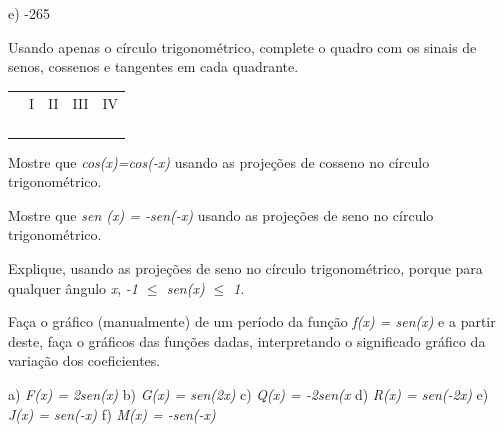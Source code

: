 \begin{exercicios}
e) -265\degree

\exitem{} Usando apenas o círculo trigonométrico, complete o quadro com os sinais de senos, cossenos e tangentes em cada quadrante.

\begin{table}[H]
             \centering
\begin{tabular}{p{0.96in}p{0.41in}p{0.39in}p{0.39in}p{0.39in}}
\hline
\multicolumn{1}{|p{0.96in}}{} &
\multicolumn{1}{|p{0.41in}}{I} &
\multicolumn{1}{|p{0.39in}}{II} &
\multicolumn{1}{|p{0.39in}}{III} &
\multicolumn{1}{|p{0.39in}|}{IV} \\
\hhline{-----}
\multicolumn{1}{|p{0.96in}}{Senos} &
\multicolumn{1}{|p{0.41in}}{} &
\multicolumn{1}{|p{0.39in}}{} &
\multicolumn{1}{|p{0.39in}}{} &
\multicolumn{1}{|p{0.39in}|}{} \\
\hhline{-----}
\multicolumn{1}{|p{0.96in}}{Cossenos} &
\multicolumn{1}{|p{0.41in}}{} &
\multicolumn{1}{|p{0.39in}}{} &
\multicolumn{1}{|p{0.39in}}{} &
\multicolumn{1}{|p{0.39in}|}{} \\
\hhline{-----}
\multicolumn{1}{|p{0.96in}}{Tangentes } &
\multicolumn{1}{|p{0.41in}}{} &
\multicolumn{1}{|p{0.39in}}{} &
\multicolumn{1}{|p{0.39in}}{} &
\multicolumn{1}{|p{0.39in}|}{} \\
\hhline{-----}

\end{tabular}
 \end{table}

\item Mostre que \textit{cos(x)=cos(-x)} usando as projeções de cosseno no círculo trigonométrico.

\item Mostre que  \textit{sen (x) = -sen(-x)} usando as projeções de seno no círculo trigonométrico.

\item Explique, usando as projeções de seno no círculo trigonométrico, porque para qualquer ângulo \textit{x}, \textit{-1 $ \leq $  sen(x) $ \leq $  1}.

\item Faça o gráfico (manualmente) de um período da função \textit{f(x) = sen(x) }e a partir deste, faça o gráficos das funções dadas, interpretando o significado gráfico da variação dos coeficientes.

a) \textit{F(x) = 2sen(x)\tab}
b) \textit{G(x) = sen(2x)\tab}
c) \textit{Q(x) = -2sen(x\tab}
d) \textit{R(x) = sen(-2x)\tab}
e) \textit{J(x) = sen(-x)\tab}
f) \textit{M(x) = -sen(-x)\tab}


\end{exercicios}
